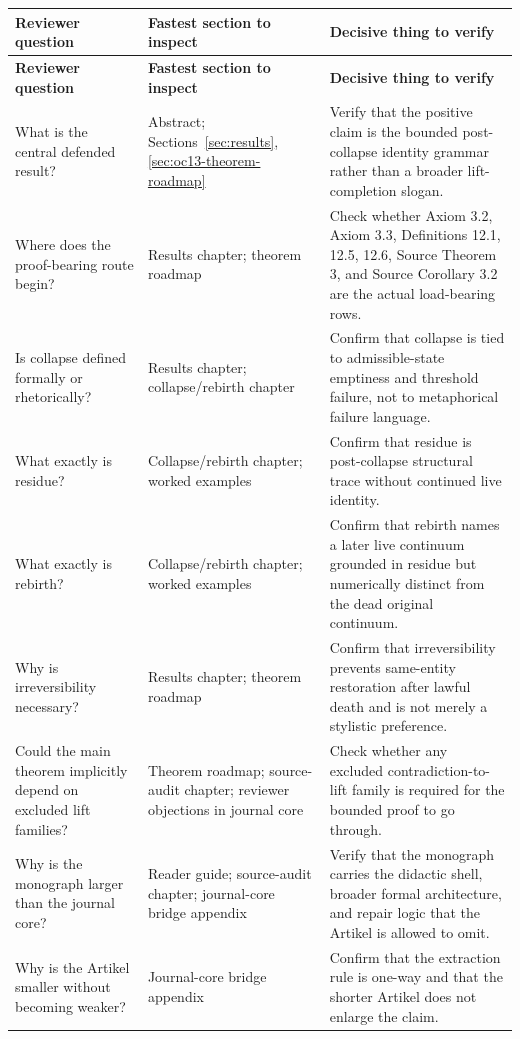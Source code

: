 \begin{longtable}{p{3.4cm} p{4.4cm} p{5.7cm}}
\toprule
\textbf{Reviewer question} & \textbf{Fastest section to inspect} & \textbf{Decisive thing to verify} \\
\midrule
\endfirsthead
\toprule
\textbf{Reviewer question} & \textbf{Fastest section to inspect} & \textbf{Decisive thing to verify} \\
\midrule
\endhead
\bottomrule
\endfoot
What is the central defended result? & Abstract; Sections~\ref{sec:results}, \ref{sec:oc13-theorem-roadmap} & Verify that the positive claim is the bounded post-collapse identity grammar rather than a broader lift-completion slogan. \\
Where does the proof-bearing route begin? & Results chapter; theorem roadmap & Check whether Axiom 3.2, Axiom 3.3, Definitions 12.1, 12.5, 12.6, Source Theorem 3, and Source Corollary 3.2 are the actual load-bearing rows. \\
Is collapse defined formally or rhetorically? & Results chapter; collapse/rebirth chapter & Confirm that collapse is tied to admissible-state emptiness and threshold failure, not to metaphorical failure language. \\
What exactly is residue? & Collapse/rebirth chapter; worked examples & Confirm that residue is post-collapse structural trace without continued live identity. \\
What exactly is rebirth? & Collapse/rebirth chapter; worked examples & Confirm that rebirth names a later live continuum grounded in residue but numerically distinct from the dead original continuum. \\
Why is irreversibility necessary? & Results chapter; theorem roadmap & Confirm that irreversibility prevents same-entity restoration after lawful death and is not merely a stylistic preference. \\
Could the main theorem implicitly depend on excluded lift families? & Theorem roadmap; source-audit chapter; reviewer objections in journal core & Check whether any excluded contradiction-to-lift family is required for the bounded proof to go through. \\
Why is the monograph larger than the journal core? & Reader guide; source-audit chapter; journal-core bridge appendix & Verify that the monograph carries the didactic shell, broader formal architecture, and repair logic that the Artikel is allowed to omit. \\
Why is the Artikel smaller without becoming weaker? & Journal-core bridge appendix & Confirm that the extraction rule is one-way and that the shorter Artikel does not enlarge the claim. \\

\end{longtable}
